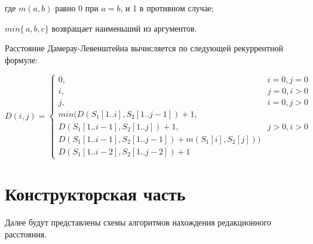 \documentclass[12pt]{report}
\begin{document}
где $m(a,b)$ равно 0 при $a=b$, и 1 в противном случае;

 $min\{\,a,b,c\}$ возвращает наименьший из аргументов.


Расстояние Дамерау-Левенштейна вычисляется по следующей рекуррентной формуле:

\begin{equation}
	D(i,j) = \left\{ \begin{array}{ll}
		0, & \textrm{$i = 0, j = 0$}\\
		i, & \textrm{$j = 0, i > 0$}\\
		j, & \textrm{$i = 0, j > 0$}\\
		min(D(S_{1}[1..i],S_{2}[1..j-1])+1,\\
		D(S_{1}[1..i-1],S_{2}[1..j]) +1, &\textrm{$j>0, i>0$}\\
		D(S_{1}[1..i-1],S_{2}[1..j-1]) + m(S_{1}[i], S_{2}[j]))\\
		D(S_{1}[1..i-2],S_{2}[1..j-2]) + 1
	\end{array}\right.
\end{equation}
	
	\chapter{Конструкторская часть}
Далее будут представлены схемы алгоритмов нахождения редакционного расстояния. 

\end{document}
